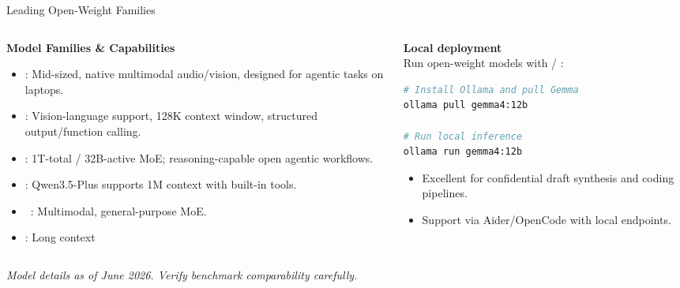 \begin{frame}[fragile]{Leading Open-Weight Families}
  \begin{columns}[T, onlytextwidth]
    \begin{column}{0.55\textwidth}
      \textbf{Model Families \& Capabilities}\\[0.3em]
      \begin{itemize}\setlength{\itemsep}{1pt}
        \item {}: Mid-sized, native multimodal audio/vision, designed for agentic tasks on laptops.
        \item {}: Vision-language support, 128K context window, structured output/function calling.
        \item {}: 1T-total / 32B-active MoE; reasoning-capable open agentic workflows.
        \item {}: Qwen3.5-Plus supports 1M context with built-in tools.
        \item {}~\parencite{jiang2023mistral}: Multimodal, general-purpose MoE.
        \item {}: Long context
      \end{itemize}
    \end{column}
    \hfill
    \begin{column}{0.42\textwidth}
      \textbf{Local deployment}\\[0.3em]
      Run open-weight models with  / :
      \begin{lstlisting}[language=bash, numbers=none, basicstyle=\ttfamily\tiny]
# Install Ollama and pull Gemma
ollama pull gemma4:12b

# Run local inference
ollama run gemma4:12b
      \end{lstlisting}
      \vspace{0.4em}
      \begin{itemize}
        \item Excellent for confidential draft synthesis and coding pipelines.
        \item Support via Aider/OpenCode with local endpoints.
      \end{itemize}
    \end{column}
  \end{columns}
  \vspace{0.4em}
  \centering\tiny\textit{Model details as of June 2026. Verify benchmark comparability carefully.}
\end{frame}

